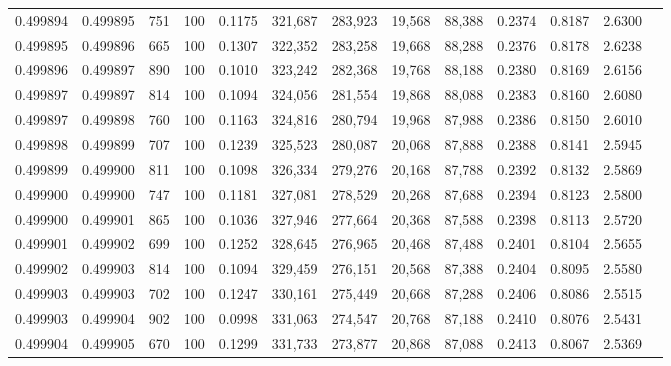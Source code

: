 \begin{tabular}{rrrrrrrrrrrrr}
0.499894 & 0.499895 &   751 & 100 &                                     0.1175 & 321,687 & 283,923 &  19,568 &  88,388 & 0.2374 & 0.8187 & 2.6300 \\
0.499895 & 0.499896 &   665 & 100 &                                     0.1307 & 322,352 & 283,258 &  19,668 &  88,288 & 0.2376 & 0.8178 & 2.6238 \\
0.499896 & 0.499897 &   890 & 100 &                                     0.1010 & 323,242 & 282,368 &  19,768 &  88,188 & 0.2380 & 0.8169 & 2.6156 \\
0.499897 & 0.499897 &   814 & 100 &                                     0.1094 & 324,056 & 281,554 &  19,868 &  88,088 & 0.2383 & 0.8160 & 2.6080 \\
0.499897 & 0.499898 &   760 & 100 &                                     0.1163 & 324,816 & 280,794 &  19,968 &  87,988 & 0.2386 & 0.8150 & 2.6010 \\
0.499898 & 0.499899 &   707 & 100 &                                     0.1239 & 325,523 & 280,087 &  20,068 &  87,888 & 0.2388 & 0.8141 & 2.5945 \\
0.499899 & 0.499900 &   811 & 100 &                                     0.1098 & 326,334 & 279,276 &  20,168 &  87,788 & 0.2392 & 0.8132 & 2.5869 \\
0.499900 & 0.499900 &   747 & 100 &                                     0.1181 & 327,081 & 278,529 &  20,268 &  87,688 & 0.2394 & 0.8123 & 2.5800 \\
0.499900 & 0.499901 &   865 & 100 &                                     0.1036 & 327,946 & 277,664 &  20,368 &  87,588 & 0.2398 & 0.8113 & 2.5720 \\
0.499901 & 0.499902 &   699 & 100 &                                     0.1252 & 328,645 & 276,965 &  20,468 &  87,488 & 0.2401 & 0.8104 & 2.5655 \\
0.499902 & 0.499903 &   814 & 100 &                                     0.1094 & 329,459 & 276,151 &  20,568 &  87,388 & 0.2404 & 0.8095 & 2.5580 \\
0.499903 & 0.499903 &   702 & 100 &                                     0.1247 & 330,161 & 275,449 &  20,668 &  87,288 & 0.2406 & 0.8086 & 2.5515 \\
0.499903 & 0.499904 &   902 & 100 &                                     0.0998 & 331,063 & 274,547 &  20,768 &  87,188 & 0.2410 & 0.8076 & 2.5431 \\
0.499904 & 0.499905 &   670 & 100 &                                     0.1299 & 331,733 & 273,877 &  20,868 &  87,088 & 0.2413 & 0.8067 & 2.5369 \\

\end{tabular}

